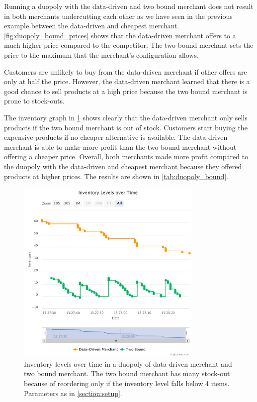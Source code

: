 Running a duopoly with the data-driven and two bound merchant does not result in both merchants undercutting each other as we have seen in the previous example between the data-driven and cheapest merchant.
\cref{fig:duopoly_bound_prices} shows that the data-driven merchant offers to a much higher price compared to the competitor.
The two bound merchant sets the price to the maximum that the merchant's configuration allows.

Customers are unlikely to buy from the data-driven merchant if other offers are only at half the price.
However, the data-driven merchant learned that there is a good chance to sell products at a high price because the two bound merchant is prone to stock-outs.

The inventory graph in \cref{fig:duopoly_bound_inventory} shows clearly that the data-driven merchant only sells products if the two bound merchant is out of stock.
Customers start buying the expensive products if no cheaper alternative is available.
The data-driven merchant is able to make more profit than the two bound merchant without offering a cheaper price.
Overall, both merchants made more profit compared to the duopoly with the data-driven and cheapest merchant because they offered products at higher prices.
The results are shown in \cref{tab:duopoly_bound}.

\begin{figure}[t]
	\centering
	\includegraphics[width=0.8\textwidth]{figures/duopoly_bound_inventory}
	\caption[Inventory Levels: Data-Driven Merchant versus Two Bound Merchant]{Inventory levels over time in a duopoly of data-driven merchant and two bound merchant. The two bound merchant has many stock-out because of reordering only if the inventory level falls below 4 items. Parameters as in \cref{section:setup}.}
	\label{fig:duopoly_bound_inventory}
\end{figure}

